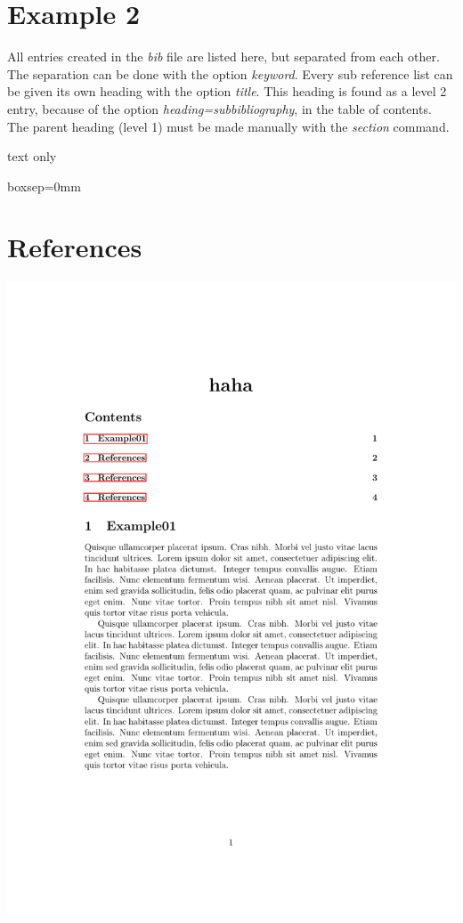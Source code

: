 \documentclass[]{myHOWTO-V001}
\begin{document}
\section{Example 2}

All entries created in the \emph{bib} file are listed here, but separated from each other. The separation can be done with the option \emph{keyword}. Every sub reference list can be given its own heading with the option \emph{title}. This heading is found as a level 2 entry, because of the option \emph{heading=subbibliography}, in the table of contents. The parent heading (level 1) must be made manually with the \emph{section} command.

\begin{myTEXEX}{text only}
\begin{mySTY}{boxsep=0mm}
\clearpage
\pagestyle{empty}
\section{References}
\printbibliography[heading=subbibliography,keyword={books},title={Books}]
\printbibliography[heading=subbibliography,keyword={online},title={Web Publications}]
\clearpage
\pagestyle{plain}
\end{mySTY}

\tcblower

\begin{center}
	\begin{myFIG}{}
		\includegraphics[page=2, scale=0.35]{examples/example01.pdf}
	\end{myFIG}
\end{center}
\end{myTEXEX}

\clearpage
\pagestyle{empty}
\printbibliography[heading=bibnumbered]
\clearpage
\pagestyle{plain}
\end{document}
